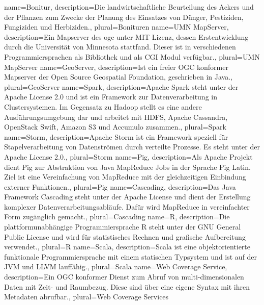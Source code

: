 {
  name=Bonitur,
  description={Die landwirtschaftliche Beurteilung des Ackers und der Pflanzen zum Zwecke der Planung des Einsatzes von Dünger, Pestiziden, Fungiziden und Herbiziden.},
  plural=Bonituren
}
{
  name=UMN MapServer,
  description={Ein Mapserver des \Gls{ogc} unter MIT Lizenz, dessen Erstentwicklung durch die Universität von Minnesota stattfand. Dieser ist in verschiedenen Programmiersprachen als Bibliothek und als CGI Modul verfügbar.},
  plural=UMN MapServer
}
{
  name=GeoServer,
  description={Ist ein freier OGC konformer Mapserver der Open Source Geospatial Foundation, geschrieben in Java.},
  plural=GeoServer
}
{
  name=Spark,
  description={Apache Spark steht unter der Apache License 2.0 und ist ein Framework zur Datenverarbeitung in Clustersystemen. Im Gegensatz zu Hadoop stellt es eine andere Ausführungsumgebung dar und arbeitet mit HDFS, Apache Cassandra, OpenStack Swift, Amazon S3 und Accumulo zusammen.}, %
  plural=Spark
}
{
  name=Storm,
  description={Apache Storm ist ein Framework speziell für Stapelverarbeitung von Datenströmen durch verteilte Prozesse. Es steht unter der Apache License 2.0.},
  plural=Storm
}
{
  name=Pig,
  description={Als Apache Projekt dient Pig zur Abstraktion von Java MapReduce Jobs in der Sprache Pig Latin. Ziel ist eine Vereinfachung von MapReduce mit der gleichzeitigen Einbindung externer Funktionen.},
  plural=Pig
}
{
  name=Cascading,
  description={Das Java Framework Cascading steht unter der Apache License und dient der Erstellung komplexer Datenverarbeitungsabläufe. Dafür wird MapReduce in vereinfachter Form zugänglich gemacht.},
  plural=Cascading
}
{
  name=R,
  description={Die plattformunabhängige Programmiersprache R steht unter der GNU General Public License und wird für statistisches Rechnen und grafische Aufbereitung verwendet.},
  plural=R
}
{
  name=Scala,
  description={Scala ist eine objektorientierte funktionale Programmiersprache mit einem statischen Typsystem und ist auf der JVM und LLVM lauffähig.},
  plural=Scala
}
{
  name=Web Coverage Service,
  description={Ein OGC konformer Dienst zum Abruf von multi-dimensionalen Daten mit Zeit- und Raumbezug. Diese sind über eine eigene Syntax mit ihren Metadaten abrufbar.},
  plural=Web Coverage Services
}
